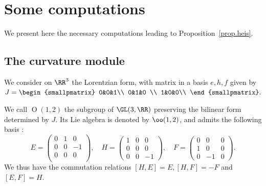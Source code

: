 \appendix

\section{Some computations}\label{AnexA}
We present here the necessary computations leading to Proposition~\ref{prop.heis}.


\subsection{The curvature module}
We consider on $\RR^3$ the Lorentzian form, with matrix in a basis $e,h,f$ given by $ J=
\begin{smallpmatrix} 0&0&1\\ 0&1&0 \\ 1&0&0\\
\end{smallpmatrix}.$

We call ${\operatorname O}(1,2)$ the subgroup of $\GL(3,\RR)$ preserving the bilinear form determined by $J$. Its Lie algebra is denoted by $\oo(1,2)$, and admits the following basis :
\[
E=
\begin{pmatrix} 0&1&0\\ 0&0& -1\\ 0&0&0\\
\end{pmatrix},\quad
H=
\begin{pmatrix} 1&0&0\\ 0&0&0 \\ 0& 0& -1
\end{pmatrix},\quad
F=
\begin{pmatrix} 0&0&0\\ 1&0&0 \\ 0&-1& 0
\end{pmatrix}.
\]
We thus have the commutation relations $[H,E]=E, [H,F]=-F$ and $[E,F]=H$.

